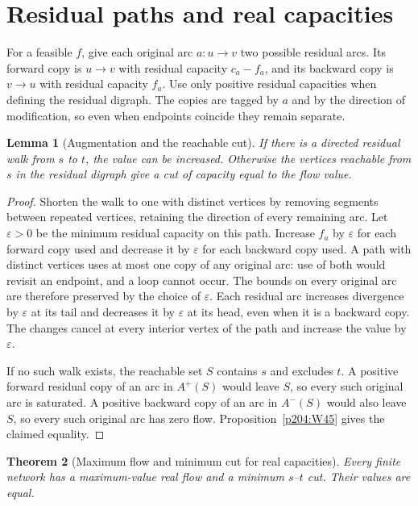 \documentclass[11pt,oneside,openany]{book}
\theoremstyle{plain}
\newtheorem{theorem}{Theorem}[chapter]
\newtheorem{lemma}[theorem]{Lemma}
\theoremstyle{definition}
\theoremstyle{remark}
\begin{document}
\section{Residual paths and real capacities}

For a feasible \(f\), give each original arc \(a:u\to v\) two possible
residual arcs. Its forward copy is \(u\to v\) with residual capacity
\(c_a-f_a\), and its backward copy is \(v\to u\) with residual capacity
\(f_a\). Use only positive residual capacities when defining the
residual digraph. The copies are tagged by \(a\) and by the direction
of modification, so even when endpoints coincide they remain separate.

\begin{lemma}[Augmentation and the reachable cut]
\label{p204:residual-path}
If there is a directed residual walk from \(s\) to \(t\), the value
can be increased. Otherwise the vertices reachable from \(s\) in the
residual digraph give a cut of capacity equal to the flow value.
\end{lemma}

\begin{proof}
Shorten the walk to one with distinct vertices by removing segments
between repeated vertices, retaining the direction of every remaining
arc. Let \(\varepsilon>0\) be the minimum residual capacity on this
path. Increase \(f_a\) by \(\varepsilon\) for each forward copy used
and decrease it by \(\varepsilon\) for each backward copy used. A
path with distinct vertices uses at most one copy of any original
arc: use of both would revisit an endpoint, and a loop cannot occur.
The bounds on every original arc are therefore preserved by the
choice of \(\varepsilon\). Each residual arc increases divergence by
\(\varepsilon\) at its tail and decreases it by \(\varepsilon\) at its
head, even when it is a backward copy. The changes cancel at every
interior vertex of the path and increase the value by \(\varepsilon\).

If no such walk exists, the reachable set \(S\) contains \(s\) and
excludes \(t\). A positive forward residual copy of an arc in \(A^+(S)\)
would leave \(S\), so every such original arc is saturated. A positive
backward copy of an arc in \(A^-(S)\) would also leave \(S\), so every
such original arc has zero flow. Proposition~\ref{p204:W45} gives the
claimed equality.
\end{proof}

\begin{theorem}[Maximum flow and minimum cut for real capacities]
\label{p204:W46}
Every finite network has a maximum-value real flow and a minimum
\(s\)--\(t\) cut. Their values are equal.
\end{theorem}
\end{document}
